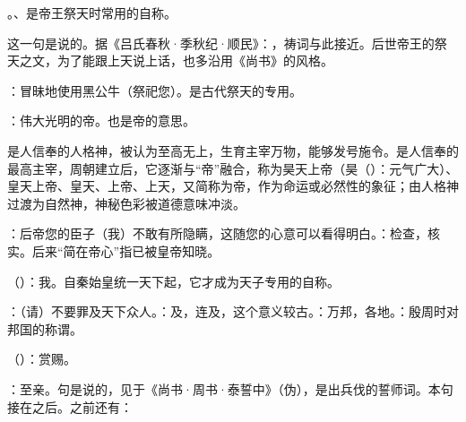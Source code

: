 {\begin{lyblobitemize}
\item {}。、是帝王祭天时常用的自称。

这一句是说的。据《吕氏春秋·季秋纪·顺民》：，祷词与此接近。后世帝王的祭天之文，为了能跟上天说上话，也多沿用《尚书》的风格。

\item {}：冒昧地使用黑公牛（祭祀您）。是古代祭天的专用。
\item {}：伟大光明的帝。也是帝的意思。

是人信奉的人格神，被认为至高无上，生育主宰万物，能够发号施令。是人信奉的最高主宰，周朝建立后，它逐渐与“帝”融合，称为昊天上帝（昊（）：元气广大）、皇天上帝、皇天、上帝、上天，又简称为帝，作为命运或必然性的象征；由人格神过渡为自然神，神秘色彩被道德意味冲淡。

\item {}：后帝您的臣子（我）不敢有所隐瞒，这随您的心意可以看得明白。：检查，核实。后来“简在帝心”指已被皇帝知晓。
\item {}（）：我。自秦始皇统一天下起，它才成为天子专用的自称。
\item {}：（请）不要罪及天下众人。：及，连及，这个意义较古。：万邦，各地。：殷周时对邦国的称谓。
\item {}（）：赏赐。
\item {}：至亲。句是说的，见于《尚书·周书·泰誓中》（伪），是出兵伐的誓师词。本句接在之后。之前还有：


\end{lyblobitemize}}
